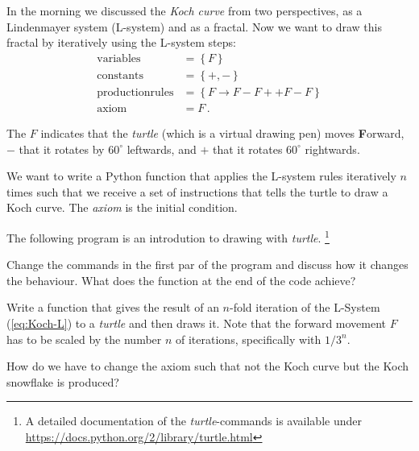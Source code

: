 \exercise[
    topic = Fractals and Self-Similarity
]


In the morning we discussed the \emph{Koch curve} from two perspectives, as a Lindenmayer system (L-system) and as a fractal. Now we want to draw this fractal by iteratively using the L-system steps:
\begin{subequations}
\label{eq:Koch-L}
\begin{align}
    \mathrm{variables} &= \left\{F\right\} \\
    \mathrm{constants} &= \left\{+,-\right\} \\
    \mathrm{production rules} &= \left\{F\rightarrow F-F++F-F\right\} \\
    \mathrm{axiom} &= F\,.
\end{align}
\end{subequations}

The $F$ indicates that the \emph{turtle} (which is a virtual drawing pen) moves {\bf F}orward, $-$ that it rotates by $60^\circ$ leftwards, and $+$ that it rotates $60^\circ$  rightwards.

\subexercise[
    topic = Iterative Application of the L-system
]
    \label{ex:L-Koch}
    
    
    We want to write a Python function that applies the L-system rules iteratively $n$ times such that we receive a set of instructions that tells the turtle to draw a Koch curve. The \emph{axiom} is the initial condition.
    
\subexercise[
    topic = Teenage Mutant L-System Turtle
    ]

The following program is an introdution to drawing with \textit{turtle}. \footnote{A detailed documentation of the \textit{turtle}-commands is available under
        \url{https://docs.python.org/2/library/turtle.html}
    }

Change the commands in the first par of the program and discuss how it
changes the behaviour. What does the function at the end of the code achieve?
    

\subexercise[
    topic = Drawing a Koch curve
    ]


Write a function that gives the result of an $n$-fold iteration of the L-System (\ref{eq:Koch-L}) to a \emph{turtle} and then draws it. Note that the forward movement $F$ has to be scaled by the number $n$ of iterations, specifically with $1/3^n$.


How do we have to change the axiom such that not the Koch curve but the Koch snowflake is produced?

